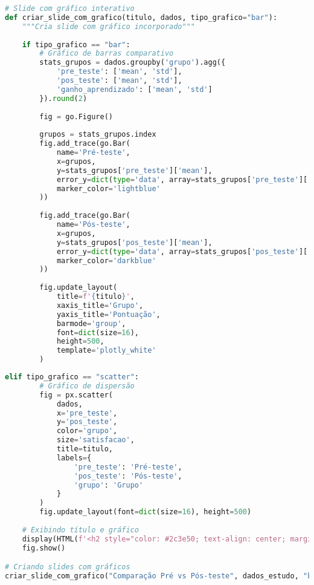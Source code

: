 \begin{pythonbox}
\begin{lstlisting}[language=Python]
# Slide com gráfico interativo
def criar_slide_com_grafico(titulo, dados, tipo_grafico="bar"):
    """Cria slide com gráfico incorporado"""
    
    if tipo_grafico == "bar":
        # Gráfico de barras comparativo
        stats_grupos = dados.groupby('grupo').agg({
            'pre_teste': ['mean', 'std'],
            'pos_teste': ['mean', 'std'],
            'ganho_aprendizado': ['mean', 'std']
        }).round(2)
        
        fig = go.Figure()
        
        grupos = stats_grupos.index
        fig.add_trace(go.Bar(
            name='Pré-teste',
            x=grupos,
            y=stats_grupos['pre_teste']['mean'],
            error_y=dict(type='data', array=stats_grupos['pre_teste']['std']),
            marker_color='lightblue'
        ))
        
        fig.add_trace(go.Bar(
            name='Pós-teste',
            x=grupos,
            y=stats_grupos['pos_teste']['mean'],
            error_y=dict(type='data', array=stats_grupos['pos_teste']['std']),
            marker_color='darkblue'
        ))
        
        fig.update_layout(
            title=f'{titulo}',
            xaxis_title='Grupo',
            yaxis_title='Pontuação',
            barmode='group',
            font=dict(size=16),
            height=500,
            template='plotly_white'
        )
           \end{lstlisting}
\end{pythonbox}

\begin{pythonbox}
\begin{lstlisting}[language=Python]       
    elif tipo_grafico == "scatter":
        # Gráfico de dispersão
        fig = px.scatter(
            dados, 
            x='pre_teste', 
            y='pos_teste',
            color='grupo',
            size='satisfacao',
            title=titulo,
            labels={
                'pre_teste': 'Pré-teste',
                'pos_teste': 'Pós-teste',
                'grupo': 'Grupo'
            }
        )
        fig.update_layout(font=dict(size=16), height=500)
    
    # Exibindo título e gráfico
    display(HTML(f'<h2 style="color: #2c3e50; text-align: center; margin: 20px 0;">{titulo}</h2>'))
    fig.show()

# Criando slides com gráficos
criar_slide_com_grafico("Comparação Pré vs Pós-teste", dados_estudo, "bar")
\end{lstlisting}
\end{pythonbox}

